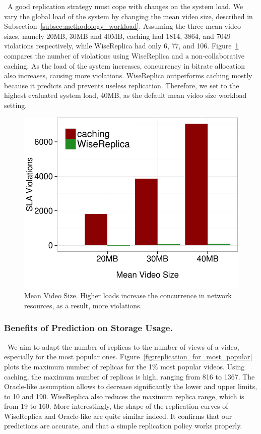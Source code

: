 \ A good replication strategy must cope with changes on the system load.  We vary the global load of the system by changing the mean video size, described in Subsection~\ref{subsec:methodology_workload}. Assuming the three mean video sizes, namely 20MB, 30MB and 40MB, caching had 1814, 3864, and 7049 violations respectively, while WiseReplica had only 6, 77, and 106. Figure~\ref{fig:mean_load_bar} compares the number of violations using WiseReplica and a non-collaborative caching. As the load of the system increases, concurrency in bitrate allocation also increases, causing more violations. WiseReplica outperforms caching mostly because it predicts and prevents useless replication. Therefore, we set to the highest evaluated system load, 40MB, as the default mean video size workload setting.

\begin{figure}
  \centering
     \includegraphics[width=.6\textwidth]{inputs/img/mean_load_bar}
  \caption{Mean Video Size. Higher loads increase the concurrence in network resources, as a result, more violations.}
  \label{fig:mean_load_bar}
\end{figure}

\subsubsection{Benefits of Prediction on Storage Usage.}

\ We aim to adapt the number of replicas to the number of views of a video, especially for the most popular ones. Figure~\ref{fig:replication_for_most_popular} plots the maximum number of replicas for the 1\% most popular videos. Using caching, the maximum number of replicas is high, ranging from 816 to 1367. The Oracle-like assumption allows to decrease significantly the lower and upper limits, to 10 and 190. WiseReplica also reduces the maximum replica range, which is from 19 to 160. More interestingly, the shape of the replication curves of WiseReplica and Oracle-like are quite similar indeed. It confirms that our predictions are accurate, and that a simple replication policy works properly.

